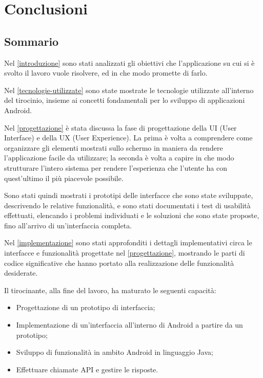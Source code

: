 \chapter{Conclusioni}

\section{Sommario}

Nel \autoref{introduzione} sono stati analizzati gli obiettivi che l'applicazione su cui si è svolto il lavoro vuole risolvere, ed in che modo promette di farlo.

Nel \autoref{tecnologie-utilizzate} sono state mostrate le tecnologie utilizzate all'interno del tirocinio, insieme ai concetti fondamentali per lo sviluppo di applicazioni Android.

Nel \autoref{progettazione} è stata discussa la fase di progettazione della UI (User Interface) e della UX (User Experience). La prima è volta a comprendere come organizzare gli elementi mostrati sullo schermo in maniera da rendere l'applicazione facile da utilizzare; la seconda è volta a capire in che modo strutturare l'intero sistema per rendere l'esperienza che l'utente ha con quest'ultimo il più piacevole possibile.

Sono stati quindi mostrati i prototipi delle interfacce che sono state sviluppate, descrivendo le relative funzionalità, e sono stati documentati i test di usabilità effettuati, elencando i problemi individuati e le soluzioni che sono state proposte, fino all'arrivo di un'interfaccia completa.

Nel \autoref{implementazione} sono stati approfonditi i dettagli implementativi circa le interfacce e funzionalità progettate nel \autoref{progettazione}, mostrando le parti di codice significative che hanno portato alla realizzazione delle funzionalità desiderate.

Il tirocinante, alla fine del lavoro, ha maturato le seguenti capacità:
\begin{itemize}
    \item Progettazione di un prototipo di interfaccia;
    \item Implementazione di un'interfaccia all'interno di Android a partire da un prototipo;
    \item Sviluppo di funzionalità in ambito Android in linguaggio Java;
    \item Effettuare chiamate API e gestire le risposte.
\end{itemize}

